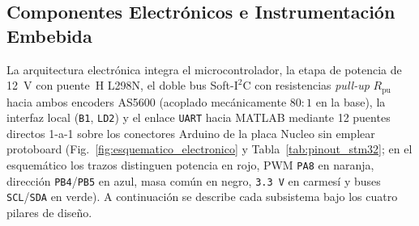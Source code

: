 \subsection{Componentes Electrónicos e Instrumentación Embebida}\label{subsec:electronica}

La arquitectura electrónica integra el microcontrolador, la etapa de potencia de \qty{12}{\volt} con puente~H L298N, el doble bus Soft-$\text{I}^2\text{C}$ con resistencias \textit{pull-up} $R_{\text{pu}}$ hacia ambos encoders AS5600 (acoplado mecánicamente $80:1$ en la base), la interfaz local (\texttt{B1}, \texttt{LD2}) y el enlace \texttt{UART} hacia MATLAB mediante 12 puentes directos 1-a-1 sobre los conectores Arduino de la placa Nucleo sin emplear protoboard (Fig.~\ref{fig:esquematico_electronico} y Tabla~\ref{tab:pinout_stm32}; en el esquemático los trazos distinguen potencia en rojo, PWM \texttt{PA8} en naranja, dirección \texttt{PB4}/\texttt{PB5} en azul, masa común en negro, \texttt{3.3\,V} en carmesí y buses \texttt{SCL}/\texttt{SDA} en verde). A continuación se describe cada subsistema bajo los cuatro pilares de diseño.



